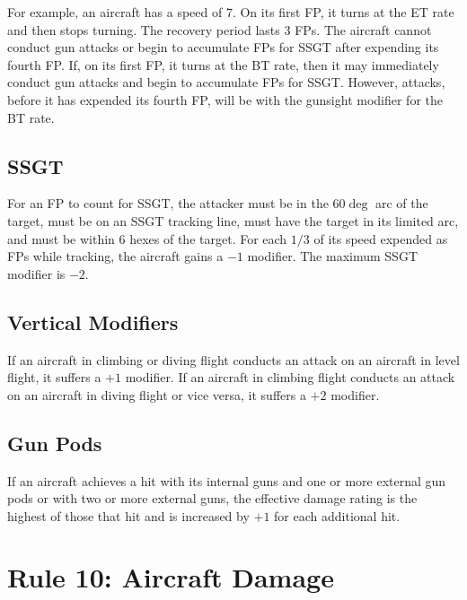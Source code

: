 \documentclass[10pt]{extarticle}
\begin{document}
For example, an aircraft has a speed of 7. On its first FP, it turns at the ET rate and then stops turning. The recovery period lasts 3 FPs. The aircraft cannot conduct gun attacks or begin to accumulate FPs for SSGT after expending its fourth FP. If, on its first FP, it turns at the BT rate, then it may immediately conduct gun attacks and begin to accumulate FPs for SSGT. However, attacks, before it has expended its fourth FP, will be with the gunsight modifier for the BT rate.

\subsection{SSGT} For an FP to count for SSGT, the attacker must be in the $60\deg$ arc of the target, must be on an SSGT tracking line,  must have the target in its limited arc, and must be within 6 hexes of the target. For each $1/3$ of its speed expended as FPs while tracking, the aircraft gains a $-1$ modifier. The maximum SSGT modifier is $-2$.

\subsection{Vertical Modifiers} If an aircraft in climbing or diving flight conducts an attack on an aircraft in level flight, it suffers a $+1$ modifier. If an aircraft in climbing flight conducts an attack on an aircraft in diving flight or vice versa, it suffers a $+2$ modifier.

\subsection{Gun Pods} If an aircraft achieves a hit with its internal guns and one or more external gun pods or with two or more external guns, the effective damage rating is the highest of those that hit and is increased by $+1$ for each additional hit.

\section{Rule 10: Aircraft Damage}
\end{document}
